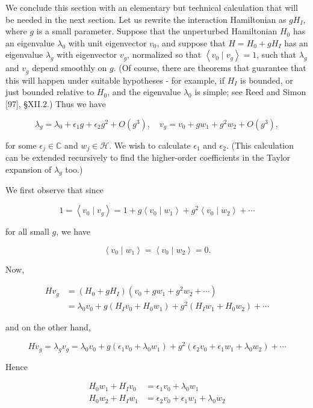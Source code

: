 \documentclass[10pt, letterpaper]{article}
\begin{document}
We conclude this section with an elementary but technical calculation that will be needed in the next section. Let us rewrite the interaction Hamiltonian as $g H_{I}$, where $g$ is a small parameter. Suppose that the unperturbed Hamiltonian $H_{0}$ has an eigenvalue $\lambda_{0}$ with unit eigenvector $v_{0}$, and suppose that $H=H_{0}+g H_{I}$ has an eigenvalue $\lambda_{g}$ with eigenvector $v_{g}$, normalized so that $\left\langle v_{0} \mid v_{g}\right\rangle=1$, such that $\lambda_{g}$ and $v_{g}$ depend smoothly on $g$. (Of course, there are theorems that guarantee that this will happen under suitable hypotheses - for example, if $H_{I}$ is bounded, or just bounded relative to $H_{0}$, and the eigenvalue $\lambda_{0}$ is simple; see Reed and Simon [97], §XII.2.) Thus we have

$$
\lambda_{g}=\lambda_{0}+\epsilon_{1} g+\epsilon_{2} g^{2}+O\left(g^{3}\right), \quad v_{g}=v_{0}+g w_{1}+g^{2} w_{2}+O\left(g^{3}\right),
$$

for some $\epsilon_{j} \in \mathbb{C}$ and $w_{j} \in \mathcal{H}$. We wish to calculate $\epsilon_{1}$ and $\epsilon_{2}$. (This calculation can be extended recursively to find the higher-order coefficients in the Taylor expansion of $\lambda_{g}$ too.)

We first observe that since

$$
1=\left\langle v_{0} \mid v_{g}\right\rangle=1+g\left\langle v_{0} \mid w_{1}\right\rangle+g^{2}\left\langle v_{0} \mid w_{2}\right\rangle+\cdots
$$

for all small $g$, we have

$$
\left\langle v_{0} \mid w_{1}\right\rangle=\left\langle v_{0} \mid w_{2}\right\rangle=0 .
$$

Now,

$$
\begin{aligned}
H v_{g} & =\left(H_{0}+g H_{I}\right)\left(v_{0}+g w_{1}+g^{2} w_{2}+\cdots\right) \\
& =\lambda_{0} v_{0}+g\left(H_{I} v_{0}+H_{0} w_{1}\right)+g^{2}\left(H_{I} w_{1}+H_{0} w_{2}\right)+\cdots
\end{aligned}
$$

and on the other hand,

$$
H v_{g}=\lambda_{g} v_{g}=\lambda_{0} v_{0}+g\left(\epsilon_{1} v_{0}+\lambda_{0} w_{1}\right)+g^{2}\left(\epsilon_{2} v_{0}+\epsilon_{1} w_{1}+\lambda_{0} w_{2}\right)+\cdots
$$

Hence

$$
\begin{aligned}
H_{0} w_{1}+H_{I} v_{0} & =\epsilon_{1} v_{0}+\lambda_{0} w_{1} \\
H_{0} w_{2}+H_{I} w_{1} & =\epsilon_{2} v_{0}+\epsilon_{1} w_{1}+\lambda_{0} w_{2}
\end{aligned}
$$
\end{document}
